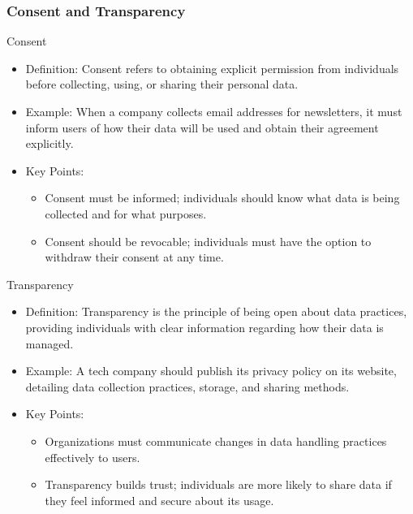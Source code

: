 \documentclass{beamer}
\begin{document}
\begin{frame}[fragile]
    \frametitle{Consent and Transparency}
    \begin{block}{Consent}
        \begin{itemize}
            \item Definition: Consent refers to obtaining explicit permission from individuals before collecting, using, or sharing their personal data.
            \item Example: When a company collects email addresses for newsletters, it must inform users of how their data will be used and obtain their agreement explicitly.
            \item Key Points:
            \begin{itemize}
                \item Consent must be informed; individuals should know what data is being collected and for what purposes.
                \item Consent should be revocable; individuals must have the option to withdraw their consent at any time.
            \end{itemize}
        \end{itemize}
    \end{block}
    
    \begin{block}{Transparency}
        \begin{itemize}
            \item Definition: Transparency is the principle of being open about data practices, providing individuals with clear information regarding how their data is managed.
            \item Example: A tech company should publish its privacy policy on its website, detailing data collection practices, storage, and sharing methods.
            \item Key Points:
            \begin{itemize}
                \item Organizations must communicate changes in data handling practices effectively to users.
                \item Transparency builds trust; individuals are more likely to share data if they feel informed and secure about its usage.
            \end{itemize}
        \end{itemize}
    \end{block}
\end{frame}
\end{document}

